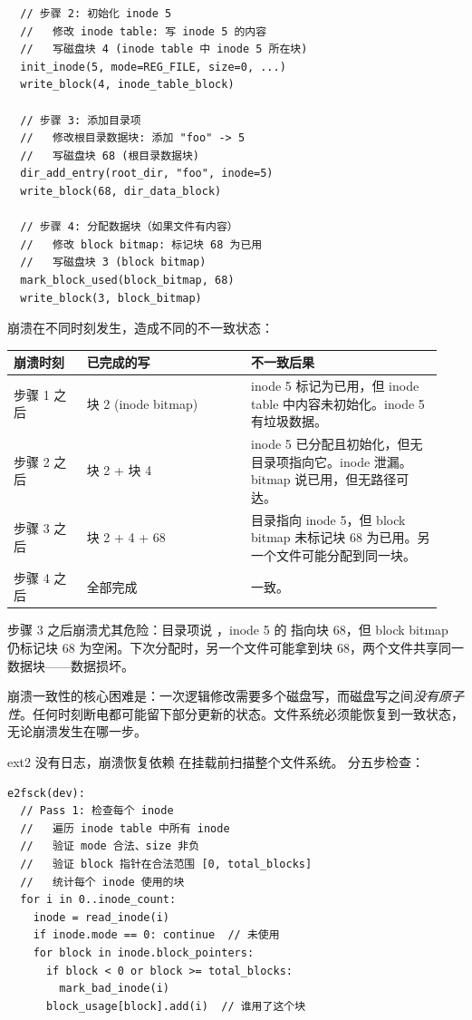 \begin{filesystemlayout}
\begin{lstlisting}
  // 步骤 2: 初始化 inode 5
  //   修改 inode table: 写 inode 5 的内容
  //   写磁盘块 4 (inode table 中 inode 5 所在块)
  init_inode(5, mode=REG_FILE, size=0, ...)
  write_block(4, inode_table_block)

  // 步骤 3: 添加目录项
  //   修改根目录数据块: 添加 "foo" -> 5
  //   写磁盘块 68 (根目录数据块)
  dir_add_entry(root_dir, "foo", inode=5)
  write_block(68, dir_data_block)

  // 步骤 4: 分配数据块（如果文件有内容）
  //   修改 block bitmap: 标记块 68 为已用
  //   写磁盘块 3 (block bitmap)
  mark_block_used(block_bitmap, 68)
  write_block(3, block_bitmap)
\end{lstlisting}

崩溃在不同时刻发生，造成不同的不一致状态：

\begin{longtable}{|F{0.16\linewidth}|F{0.36\linewidth}|F{0.42\linewidth}|}
\toprule
{}
崩溃时刻 & 已完成的写 & 不一致后果 \\
\midrule
步骤 1 之后 & 块 2 (inode bitmap) & inode 5 标记为已用，但 inode table 中内容未初始化。inode 5 有垃圾数据。 \\\tablerowrule
步骤 2 之后 & 块 2 + 块 4 & inode 5 已分配且初始化，但无目录项指向它。inode 泄漏。bitmap 说已用，但无路径可达。 \\\tablerowrule
步骤 3 之后 & 块 2 + 4 + 68 & 目录指向 inode 5，但 block bitmap 未标记块 68 为已用。另一个文件可能分配到同一块。 \\\tablerowrule
步骤 4 之后 & 全部完成 & 一致。 \\
\bottomrule
\end{longtable}

步骤 3 之后崩溃尤其危险：目录项说 ，inode 5 的  指向块 68，但 block bitmap 仍标记块 68 为空闲。下次分配时，另一个文件可能拿到块 68，两个文件共享同一数据块——数据损坏。

\begin{keyidea}
崩溃一致性的核心困难是：一次逻辑修改需要多个磁盘写，而磁盘写之间\emph{没有原子性}。任何时刻断电都可能留下部分更新的状态。文件系统必须能恢复到一致状态，无论崩溃发生在哪一步。
\end{keyidea}


ext2 没有日志，崩溃恢复依赖  在挂载前扫描整个文件系统。 分五步检查：

\begin{lstlisting}
e2fsck(dev):
  // Pass 1: 检查每个 inode
  //   遍历 inode table 中所有 inode
  //   验证 mode 合法、size 非负
  //   验证 block 指针在合法范围 [0, total_blocks]
  //   统计每个 inode 使用的块
  for i in 0..inode_count:
    inode = read_inode(i)
    if inode.mode == 0: continue  // 未使用
    for block in inode.block_pointers:
      if block < 0 or block >= total_blocks:
        mark_bad_inode(i)
      block_usage[block].add(i)  // 谁用了这个块


\end{lstlisting}
\end{filesystemlayout}
